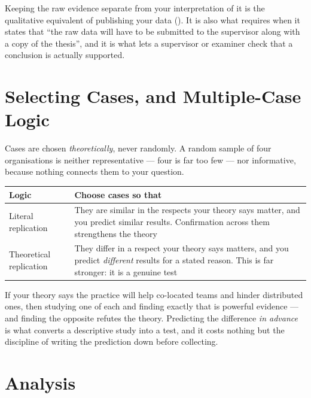 \begin{alertbox}
Keeping the raw evidence separate from your interpretation of it is the
qualitative equivalent of publishing your data (). It is
also what  requires when it states that ``the raw
data will have to be submitted to the supervisor along with a copy of the
thesis'', and it is what lets a supervisor or examiner check that a conclusion
is actually supported.
\end{alertbox}

\section{Selecting Cases, and Multiple-Case Logic}

Cases are chosen \emph{theoretically}, never randomly. A random sample of four
organisations is neither representative --- four is far too few --- nor
informative, because nothing connects them to your question.

\begin{center}
\small
\begin{tabular}{@{}L{3.6cm}L{10.7cm}@{}}
\toprule
\textbf{Logic} & \textbf{Choose cases so that} \\
\midrule
Literal replication
  & They are similar in the respects your theory says matter, and you predict
    similar results. Confirmation across them strengthens the theory \\
Theoretical replication
  & They differ in a respect your theory says matters, and you predict
    \emph{different} results for a stated reason. This is far stronger: it is
    a genuine test \\
\bottomrule
\end{tabular}
\end{center}

\begin{conceptbox}
If your theory says the practice will help co-located teams and hinder
distributed ones, then studying one of each and finding exactly that is
powerful evidence --- and finding the opposite refutes the theory. Predicting
the difference \emph{in advance} is what converts a descriptive study into a
test, and it costs nothing but the discipline of writing the prediction down
before collecting.
\end{conceptbox}

\section{Analysis}

